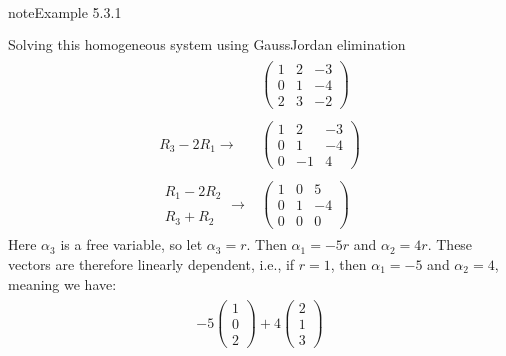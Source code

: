 \documentclass[letterpaper,10pt,english]{jupyterBook}
\begin{document}
\begin{sphinxadmonition}{note}{Example 5.3.1}
\begin{equation*}
\begin{split}
\begin{align*}
\end{align*} \end{split}
\end{equation*}
\sphinxAtStartPar
Solving this homogeneous system using Gauss\sphinxhyphen{}Jordan elimination
\begin{equation*}
\begin{split} \begin{align*}
    & \left( \begin{array}{ccc}
        1 & 2 & -3\\
        0 & 1 & -4\\
        2 & 3 & -2
    \end{array} \right)
    \\ \\
    R_3 - 2R_1 \longrightarrow
    &\left( \begin{array}{ccc}
        1 & 2 & -3\\
        0 & 1 & -4\\
        0 & -1 & 4
    \end{array} \right)
	\\ \\
    \begin{matrix} R_1 - 2R_2 \\ \\ R_3 + R_2 \end{matrix} \longrightarrow
    &\left( \begin{array}{ccc}
        1 & 0 & 5\\
        0 & 1 & -4\\
        0 & 0 & 0
    \end{array} \right)
\end{align*} \end{split}
\end{equation*}
\sphinxAtStartPar
Here \(\alpha_3\) is a free variable, so let \(\alpha_3 = r\). Then \(\alpha_1 = -5r\) and \(\alpha_2 = 4r\). These vectors are therefore linearly dependent, i.e., if \(r = 1\), then \(\alpha_1 = -5\) and \(\alpha_2 = 4\), meaning we have:
\begin{equation*}
\begin{split} \begin{align*}
    - 5 \begin{pmatrix} 1 \\ 0 \\ 2 \end{pmatrix}
    + 4 \begin{pmatrix} 2 \\ 1 \\ 3 \end{pmatrix}

\end{align*}
\end{split}
\end{equation*}
\end{sphinxadmonition}
\end{document}
